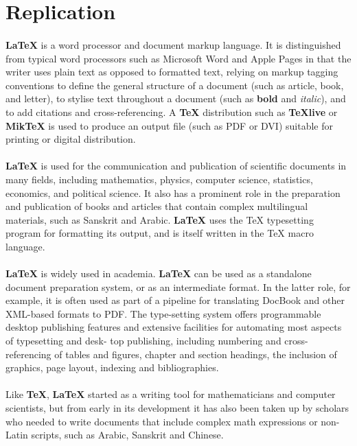 \documentclass[titlepage,11pt,a4paper]{article}
\begin{document}
\section{Replication}
\paragraph{}
\textbf{LaTeX} is a word processor and document markup language. It is distinguished from typical word processors such as Microsoft Word and Apple Pages in that the writer uses plain text as opposed to formatted text, relying on markup tagging conventions to define the general structure of a document (such as article, book, and letter), to stylise text throughout a document (such as \textbf{bold} and \textit{italic}), and to add citations and cross-referencing. A {\bf TeX} distribution such as {\bf TeXlive} or {\bf MikTeX} is used to produce an output file (such as PDF or DVI) suitable for printing or digital distribution.

\paragraph{}
\textbf{LaTeX} is used for the communication and publication of scientific documents in many fields, including mathematics, physics, computer science, statistics, economics, and political science. It also has a prominent role in the preparation and publication of books and articles that contain complex multilingual materials, such as Sanskrit and Arabic. \textbf{LaTeX} uses the TeX typesetting program for formatting its output, and is itself written in the TeX macro language.

\paragraph{}
\textbf{LaTeX} is widely used in academia. \textbf{LaTeX} can be used as a standalone document preparation system, or as an intermediate format. In the latter role, for example, it is often used as part of a pipeline for translating DocBook and other XML-based formats to PDF. The type-setting system offers programmable desktop publishing features and extensive facilities for automating most aspects of typesetting and desk- top publishing, including numbering and cross-referencing of tables and figures, chapter and section headings, the inclusion of graphics, page layout, indexing and bibliographies.

\paragraph{}
Like {\bf TeX}, \textbf{LaTeX} started as a writing tool for mathematicians and computer scientists, but from early in its development it has also been taken up by scholars who needed to write documents that include complex math expressions or non-Latin scripts, such as Arabic, Sanskrit%
    and Chinese.
\end{document}
